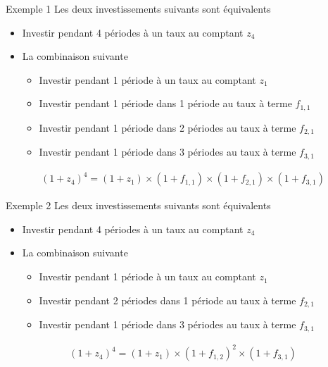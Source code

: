 \documentclass{beamer}
\begin{document}
\begin{frame}{Exemple 1}
Les deux investissements suivants sont équivalents
\begin{itemize}
\item Investir pendant 4 périodes à un taux au comptant $z_4$
\item La combinaison suivante
\begin{itemize}
\item Investir pendant 1 période à un taux au comptant $z_1$
\item Investir pendant 1 période dans 1 période au taux à terme $f_{1,1}$
\item Investir pendant 1 période dans 2 périodes au taux à terme $f_{2,1}$
\item Investir pendant 1 période dans 3 périodes au taux à terme $f_{3,1}$
\end{itemize}
\end{itemize}
\begin{align*}
(1+z_4)^4=(1+z_1) \times (1+f_{1,1}) \times (1+f_{2,1}) \times (1+f_{3,1})
\end{align*}
\end{frame}

\begin{frame}{Exemple 2}
Les deux investissements suivants sont équivalents
\begin{itemize}
\item Investir pendant 4 périodes à un taux au comptant $z_4$
\item La combinaison suivante
\begin{itemize}
\item Investir pendant 1 période à un taux au comptant $z_1$
\item Investir pendant 2 périodes dans 1 période au taux à terme $f_{2,1}$
\item Investir pendant 1 période dans 3 périodes au taux à terme $f_{3,1}$
\end{itemize}
\end{itemize}
\begin{align*}
(1+z_4)^4=(1+z_1) \times (1+f_{1,2})^2 \times (1+f_{3,1})
\end{align*}
\end{frame}
\end{document}
